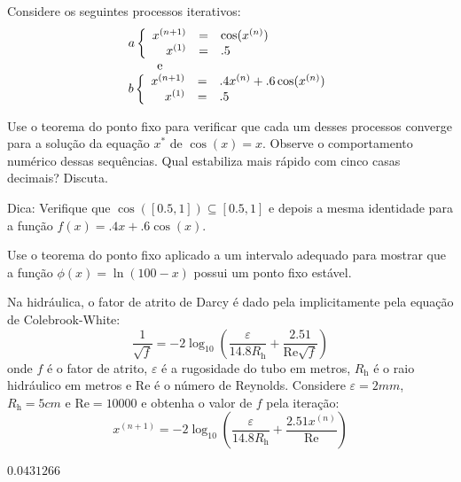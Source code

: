 \begin{Exercise} Considere os seguintes processos iterativos:
\begin{equation}
\begin{array}{l}
a\left\{\begin{array}{rcl}
x^{(n+1)}&=&\cos(x^{(n)})\\
x^{(1)}&=&.5
\end{array}
\right. \\ \qquad \hbox { e }\\
b\left\{\begin{array}{rcl}
x^{(n+1)}&=&.4x^{(n)}+.6\cos(x^{(n)})\\
x^{(1)}&=&.5
\end{array}
\right.
\end{array}
\end{equation}

Use o teorema do ponto fixo para verificar que cada um desses processos converge para a solução da equação $x^*$ de $\cos(x)=x$. Observe o comportamento numérico dessas sequências. Qual estabiliza mais rápido com cinco casas decimais? Discuta.

Dica: Verifique que $\cos([0.5,1])\subseteq [0.5,1]$ e depois a mesma identidade para a função $f(x)=.4x+.6\cos(x)$.
\end{Exercise}


\begin{Exercise}  Use o teorema do ponto fixo aplicado a um intervalo adequado para mostrar que a função $\phi(x)=\ln (100-x)$ possui um ponto fixo estável.
\end{Exercise}

\begin{Exercise}[title=Fluidos] Na hidráulica, o fator de atrito de Darcy é dado pela implicitamente pela equação de Colebrook-White:
$$\frac{1}{\sqrt{f}}= -2 \log_{10} \left( \frac{\varepsilon}{14.8 R_\mathrm{h}} + \frac{2.51}{\mathrm{Re}\sqrt{f}} \right)$$
onde $f$ é o fator de atrito, $\varepsilon$ é a rugosidade do tubo em metros, $R_\mathrm{h}$ é o raio hidráulico em metros e $\mathrm{Re}$ é o número de Reynolds. Considere $\varepsilon=2mm$, $R_\mathrm{h}=5cm$ e $\mathrm{Re}=10000$ e obtenha o valor de $f$ pela iteração:
$$x^{(n+1)}=-2 \log_{10} \left( \frac{\varepsilon}{14.8 R_\mathrm{h}} + \frac{2.51x^{(n)}}{\mathrm{Re}} \right)$$
\end{Exercise}
\begin{Answer}
  \begin{tiny}
$0.0431266$
  \end{tiny}
\end{Answer}

